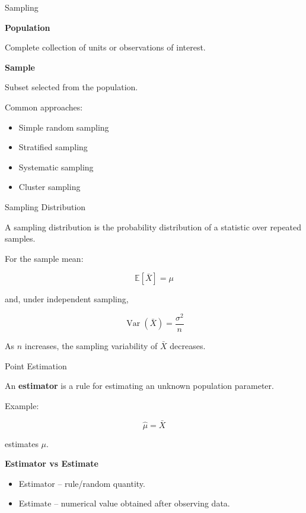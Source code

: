 \documentclass[aspectratio=169,11pt]{beamer}
\newcommand{\E}{\mathbb{E}}
\newcommand{\Var}{\operatorname{Var}}
\begin{document}
\begin{frame}{Sampling}

\textbf{Population}

Complete collection of units or observations of interest.

\textbf{Sample}

Subset selected from the population.

Common approaches:

\begin{itemize}
    \item Simple random sampling
    \item Stratified sampling
    \item Systematic sampling
    \item Cluster sampling
\end{itemize}

\end{frame}

\begin{frame}{Sampling Distribution}

A sampling distribution is the probability distribution of a statistic over repeated samples.

For the sample mean:

\[
\E[\bar X]=\mu
\]

and, under independent sampling,

\[
\boxed{
\Var(\bar X)=\frac{\sigma^2}{n}
}
\]

As $n$ increases, the sampling variability of $\bar X$ decreases.

\end{frame}

\begin{frame}{Point Estimation}

An \textbf{estimator} is a rule for estimating an unknown population parameter.

Example:

\[
\boxed{
\hat\mu=\bar X
}
\]

estimates $\mu$.

\textbf{Estimator vs Estimate}

\begin{itemize}
    \item Estimator -- rule/random quantity.
    \item Estimate -- numerical value obtained after observing data.
\end{itemize}

\end{frame}
\end{document}
